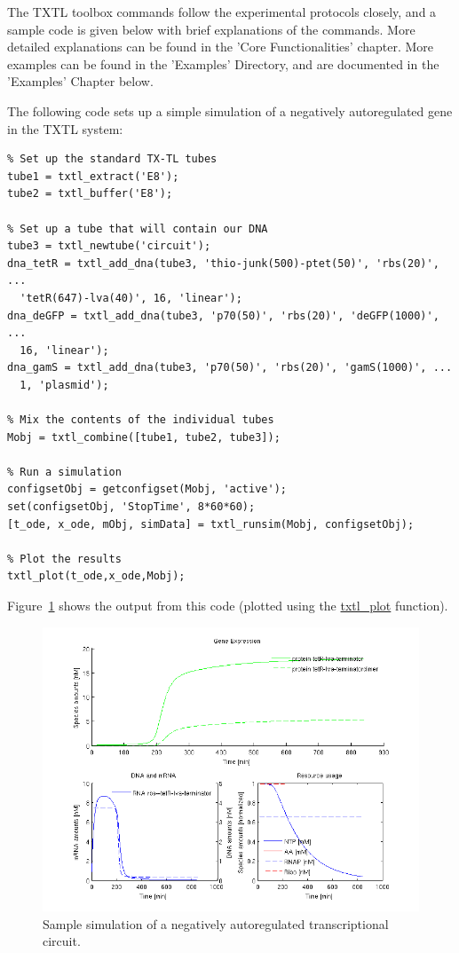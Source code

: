 The TXTL toolbox commands follow the experimental protocols closely,
and a sample code is given below with brief explanations
of the commands. More detailed explanations can be found in the
'Core Functionalities' chapter. More examples can be found in
the 'Examples' Directory, and are documented in the 'Examples' Chapter
below.

The following code sets up a simple simulation of a negatively
autoregulated gene in the TXTL system:
\begin{verbatim}
% Set up the standard TX-TL tubes
tube1 = txtl_extract('E8');
tube2 = txtl_buffer('E8');

% Set up a tube that will contain our DNA
tube3 = txtl_newtube('circuit');
dna_tetR = txtl_add_dna(tube3, 'thio-junk(500)-ptet(50)', 'rbs(20)', ...
  'tetR(647)-lva(40)', 16, 'linear');
dna_deGFP = txtl_add_dna(tube3, 'p70(50)', 'rbs(20)', 'deGFP(1000)', ...
  16, 'linear');
dna_gamS = txtl_add_dna(tube3, 'p70(50)', 'rbs(20)', 'gamS(1000)', ...
  1, 'plasmid');

% Mix the contents of the individual tubes 
Mobj = txtl_combine([tube1, tube2, tube3]);

% Run a simulation
configsetObj = getconfigset(Mobj, 'active');
set(configsetObj, 'StopTime', 8*60*60);
[t_ode, x_ode, mObj, simData] = txtl_runsim(Mobj, configsetObj);

% Plot the results
txtl_plot(t_ode,x_ode,Mobj);
\end{verbatim}
Figure~\ref{fig:intro:negautoreg} shows the output from this code (plotted
using the \url{txtl_plot} function).
\begin{figure}
  \centering
  \includegraphics[width=\textwidth]{negauto_1nM_toolbox}
  \caption{Sample simulation of a negatively autoregulated
  transcriptional circuit.}
  \label{fig:intro:negautoreg}
\end{figure}
